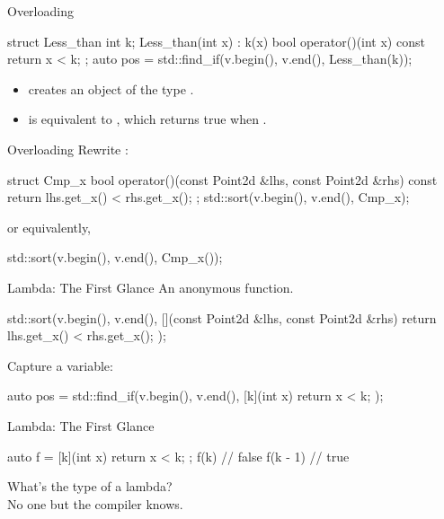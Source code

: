 \begin{frame}[fragile]{Overloading }
    \begin{cpp}
struct Less_than {
  int k;
  Less_than(int x) : k(x) {}
  bool operator()(int x) const {
    return x < k;
  }
};
auto pos = std::find_if(v.begin(), v.end(), Less_than(k));
    \end{cpp}
    \begin{itemize}
        \item {} creates an object of the type .
        \item {} is equivalent to , which returns true when .
    \end{itemize}
\end{frame}

\begin{frame}[fragile]{Overloading }
    Rewrite :
    \begin{cpp}
struct Cmp_x {
  bool operator()(const Point2d &lhs, const Point2d &rhs) const {
    return lhs.get_x() < rhs.get_x();
  }
};
std::sort(v.begin(), v.end(), Cmp_x{});
    \end{cpp}
    or equivalently,
    \begin{cpp}
std::sort(v.begin(), v.end(), Cmp_x());
    \end{cpp}
\end{frame}

\begin{frame}[fragile]{Lambda: The First Glance}
    An anonymous function.
    \begin{cpp}
std::sort(v.begin(), v.end(),
    [](const Point2d &lhs, const Point2d &rhs) {
      return lhs.get_x() < rhs.get_x();
    });
    \end{cpp}
    \pause
    Capture a variable:
    \begin{cpp}
auto pos = std::find_if(v.begin(), v.end(),
    [k](int x) { return x < k; });
    \end{cpp}
\end{frame}

\begin{frame}[fragile]{Lambda: The First Glance}
    \begin{cpp}
auto f = [k](int x) { return x < k; };
f(k)     // false
f(k - 1) // true
    \end{cpp}
    What's the type of a lambda?\\
    \pause
    No one but the compiler knows.
\end{frame}

